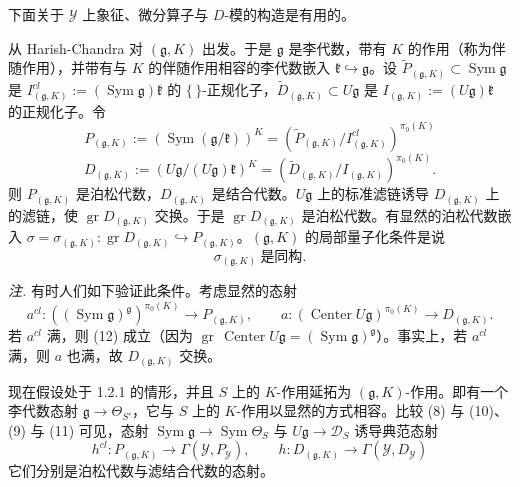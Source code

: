 下面关于 $\mathcal{Y}$ 上象征、微分算子与 $D$-模的构造是有用的。

 从 Harish-Chandra 对 $(\mathfrak{g},K)$ 出发。于是 $\mathfrak{g}$ 是李代数，带有 $K$ 的作用（称为伴随作用），并带有与 $K$ 的伴随作用相容的李代数嵌入 $\mathfrak{k}\hookrightarrow\mathfrak{g}$。设 $\tilde{P}_{(\mathfrak{g},K)}\subset\operatorname{Sym}\mathfrak{g}$ 是 $I^{cl}_{(\mathfrak{g},K)}:=(\operatorname{Sym}\mathfrak{g})\mathfrak{k}$ 的 $\{\,\}$-正规化子，$\tilde{D}_{(\mathfrak{g},K)}\subset U\mathfrak{g}$ 是 $I_{(\mathfrak{g},K)}:=(U\mathfrak{g})\mathfrak{k}$ 的正规化子。令
\begin{equation}\tag{10}
P_{(\mathfrak{g},K)}:=(\operatorname{Sym}(\mathfrak{g}/\mathfrak{k}))^{K}=(\tilde{P}_{(\mathfrak{g},K)}/I^{cl}_{(\mathfrak{g},K)})^{\pi_0(K)}
\end{equation}
\begin{equation}\tag{11}
D_{(\mathfrak{g},K)}:=(U\mathfrak{g}/(U\mathfrak{g})\mathfrak{k})^{K}=(\tilde{D}_{(\mathfrak{g},K)}/I_{(\mathfrak{g},K)})^{\pi_0(K)}.
\end{equation}
则 $P_{(\mathfrak{g},K)}$ 是泊松代数，$D_{(\mathfrak{g},K)}$ 是结合代数。$U\mathfrak{g}$ 上的标准滤链诱导 $D_{(\mathfrak{g},K)}$ 上的滤链，使 $\operatorname{gr}D_{(\mathfrak{g},K)}$ 交换。于是 $\operatorname{gr}D_{(\mathfrak{g},K)}$ 是泊松代数。有显然的泊松代数嵌入 $\sigma=\sigma_{(\mathfrak{g},K)}:\operatorname{gr}D_{(\mathfrak{g},K)}\hookrightarrow P_{(\mathfrak{g},K)}$。$(\mathfrak{g},K)$ 的局部量子化条件是说
\begin{equation}\tag{12}
\sigma_{(\mathfrak{g},K)}\ \text{是同构}.
\end{equation}


\emph{注.} 有时人们如下验证此条件。考虑显然的态射
\begin{equation}\tag{13}
a^{cl}:((\operatorname{Sym}\mathfrak{g})^{\mathfrak{g}})^{\pi_0(K)}\to P_{(\mathfrak{g},K)},\qquad
a:(\operatorname{Center}U\mathfrak{g})^{\pi_0(K)}\to D_{(\mathfrak{g},K)}.
\end{equation}
若 $a^{cl}$ 满，则 (12) 成立（因为 $\operatorname{gr}\,\operatorname{Center}U\mathfrak{g}=(\operatorname{Sym}\mathfrak{g})^{\mathfrak{g}}$）。事实上，若 $a^{cl}$ 满，则 $a$ 也满，故 $D_{(\mathfrak{g},K)}$ 交换。

 现在假设处于 1.2.1 的情形，并且 $S$ 上的 $K$-作用延拓为 $(\mathfrak{g},K)$-作用。即有一个李代数态射 $\mathfrak{g}\to\Theta_{S'}$，它与 $S$ 上的 $K$-作用以显然的方式相容。比较 (8) 与 (10)、(9) 与 (11) 可见，态射 $\operatorname{Sym}\mathfrak{g}\to\operatorname{Sym}\Theta_S$ 与 $U\mathfrak{g}\to\mathcal{D}_S$ 诱导典范态射
\begin{equation}\tag{14}
h^{cl}:P_{(\mathfrak{g},K)}\to\Gamma(\mathcal{Y},P_{\mathcal{Y}}),\qquad
h:D_{(\mathfrak{g},K)}\to\Gamma(\mathcal{Y},D_{\mathcal{Y}})
\end{equation}
它们分别是泊松代数与滤结合代数的态射。

